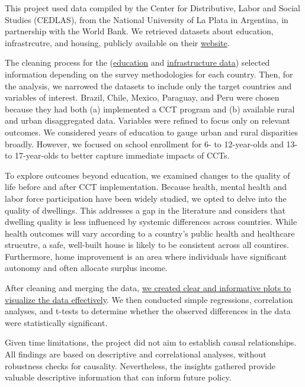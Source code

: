\documentclass[
  10pt,
]{article}
\begin{document}
This project used data compiled by the Center for Distributive, Labor
and Social Studies (CEDLAS), from the National University of La Plata in
Argentina, in partnership with the World Bank. We retrieved datasets
about education, infrastrcutre, and housing, publicly available on their
\href{https://www.cedlas.econo.unlp.edu.ar/wp/en/estadisticas/sedlac/estadisticas/}{website}.

The cleaning process for the (\href{./cleaning_education.qmd}{education}
and \href{./cleaning_infraestructure.qmd}{infrastructure data}) selected
information depending on the survey methodologies for each country.
Then, for the analysis, we narrowed the datasets to include only the
target countries and variables of interest. Brazil, Chile, Mexico,
Paraguay, and Peru were chosen because they had both (a) implemented a
CCT program and (b) available rural and urban disaggregated data.
Variables were refined to focus only on relevant outcomes. We considered
years of education to gauge urban and rural disparities broadly.
However, we focused on school enrollment for 6- to 12-year-olds and 13-
to 17-year-olds to better capture immediate impacts of CCTs.

To explore outcomes beyond education, we examined changes to the quality
of life before and after CCT implementation. Because health, mental
health and labor force participation have been widely studied, we opted
to delve into the quality of dwellings. This addresses a gap in the
literature and considers that dwelling quality is less influenced by
systemic differences across countries. While health outcomes will vary
according to a country's public health and healthcare strucutre, a safe,
well-built house is likely to be consistent across all countires.
Furthermore, home improvement is an area where individuals have
significant autonomy and often allocate surplus income.

After cleaning and merging the data,
\href{./final_project_analysis.qmd}{we created clear and informative
plots to visualize the data effectively}. We then conducted simple
regressions, correlation analyses, and t-tests to determine whether the
observed differences in the data were statistically significant.

Given time limitations, the project did not aim to establish causal
relationships. All findings are based on descriptive and correlational
analyses, without robustness checks for causality. Nevertheless, the
insights gathered provide valuable descriptive information that can
inform future policy.
\end{document}
